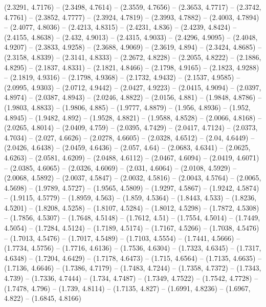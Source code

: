 {  (2.3291, 4.7176) -- (2.3498, 4.7614) -- (2.3559, 4.7656) -- (2.3653, 4.7717) 
  -- (2.3742, 4.7761) -- (2.3852, 4.7777) -- (2.3924, 4.7819) -- (2.3993, 
  4.7882) -- (2.4003, 4.7894) -- (2.4077, 4.8036) -- (2.4213, 4.8315) -- 
  (2.4231, 4.836) -- (2.4239, 4.8424) -- (2.4155, 4.8638) -- (2.432, 4.9013) -- 
  (2.4315, 4.9033) -- (2.4296, 4.9095) -- (2.4048, 4.9207) -- (2.3833, 4.9258) 
  -- (2.3688, 4.9069) -- (2.3619, 4.894) -- (2.3424, 4.8685) -- (2.3158, 4.8339)
   -- (2.3141, 4.8333) -- (2.2672, 4.8228) -- (2.2055, 4.8222) -- (2.1886, 
  4.8295) -- (2.1837, 4.8331) -- (2.1821, 4.8466) -- (2.1798, 4.9165) -- 
  (2.1823, 4.9288) -- (2.1819, 4.9316) -- (2.1798, 4.9368) -- (2.1732, 4.9432) 
  -- (2.1537, 4.9585) -- (2.0995, 4.9303) -- (2.0712, 4.9442) -- (2.0427, 
  4.9223) -- (2.0415, 4.9094) -- (2.0397, 4.8974) -- (2.0387, 4.8943) -- 
  (2.0246, 4.8822) -- (2.0156, 4.881) -- (1.9848, 4.8786) -- (1.9803, 4.8833) --
   (1.9806, 4.885) -- (1.9777, 4.8879) -- (1.956, 4.8936) -- (1.952, 4.8945) -- 
  (1.9482, 4.892) -- (1.9528, 4.8821) -- (1.9588, 4.8528) -- (2.0066, 4.8168) --
   (2.0265, 4.8014) -- (2.0409, 4.759) -- (2.0395, 4.7429) -- (2.0417, 4.7124) 
  -- (2.0373, 4.7034) -- (2.027, 4.6626) -- (2.0278, 4.6605) -- (2.0328, 4.6512)
   -- (2.04, 4.6449) -- (2.0426, 4.6438) -- (2.0459, 4.6436) -- (2.057, 4.64) --
   (2.0683, 4.6341) -- (2.0625, 4.6263) -- (2.0581, 4.6209) -- (2.0488, 4.6112) 
  -- (2.0467, 4.6094) -- (2.0419, 4.6071) -- (2.0385, 4.6065) -- (2.0326, 
  4.6069) -- (2.031, 4.6064) -- (2.0108, 4.5929) -- (2.0068, 4.5892) -- (2.0037,
   4.5847) -- (2.0032, 4.5816) -- (2.0043, 4.5764) -- (2.0065, 4.5698) -- 
  (1.9789, 4.5727) -- (1.9565, 4.5809) -- (1.9297, 4.5867) -- (1.9242, 4.5874) 
  -- (1.9115, 4.5779) -- (1.8959, 4.563) -- (1.859, 4.5364) -- (1.8443, 4.533) 
  -- (1.8236, 4.5201) -- (1.8208, 4.5258) -- (1.8107, 4.5284) -- (1.8012, 
  4.5298) -- (1.7872, 4.5308) -- (1.7856, 4.5307) -- (1.7648, 4.5148) -- 
  (1.7612, 4.51) -- (1.7554, 4.5014) -- (1.7449, 4.5054) -- (1.7284, 4.5124) -- 
  (1.7189, 4.5174) -- (1.7167, 4.5266) -- (1.7038, 4.5476) -- (1.7013, 4.5476) 
  -- (1.7017, 4.5489) -- (1.7103, 4.5554) -- (1.7441, 4.5666) -- (1.7734, 
  4.5756) -- (1.7716, 4.6136) -- (1.7536, 4.6304) -- (1.7323, 4.6345) -- 
  (1.7317, 4.6348) -- (1.7204, 4.6429) -- (1.7178, 4.6473) -- (1.715, 4.6564) --
   (1.7135, 4.6635) -- (1.7136, 4.6646) -- (1.7386, 4.7179) -- (1.7483, 4.7244) 
  -- (1.7358, 4.7372) -- (1.7343, 4.739) -- (1.7336, 4.7444) -- (1.734, 4.7487) 
  -- (1.7349, 4.7522) -- (1.7542, 4.7728) -- (1.7478, 4.796) -- (1.739, 4.8114) 
  -- (1.7135, 4.827) -- (1.6991, 4.8236) -- (1.6967, 4.822) -- (1.6845, 4.8166) 
}
